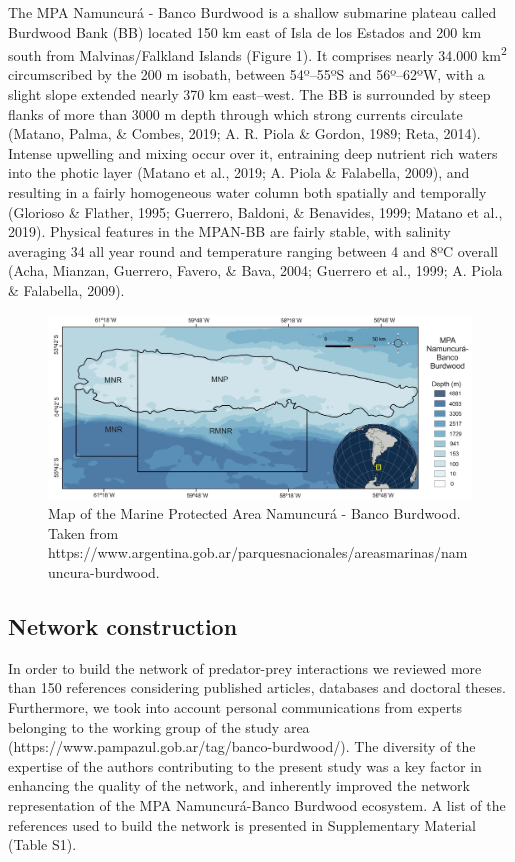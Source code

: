 \documentclass[preprint, 3p,
authoryear]{elsarticle} %
\begin{document}
The MPA Namuncurá - Banco Burdwood is a shallow submarine plateau called
Burdwood Bank (BB) located 150 km east of Isla de los Estados and 200 km
south from Malvinas/Falkland Islands (Figure 1). It comprises nearly
34.000 km\textsuperscript{2} circumscribed by the 200 m isobath, between
54º--55ºS and 56º--62ºW, with a slight slope extended nearly 370 km
east--west. The BB is surrounded by steep flanks of more than 3000 m
depth through which strong currents circulate (Matano, Palma, \& Combes,
2019; A. R. Piola \& Gordon, 1989; Reta, 2014). Intense upwelling and
mixing occur over it, entraining deep nutrient rich waters into the
photic layer (Matano et al., 2019; A. Piola \& Falabella, 2009), and
resulting in a fairly homogeneous water column both spatially and
temporally (Glorioso \& Flather, 1995; Guerrero, Baldoni, \& Benavides,
1999; Matano et al., 2019). Physical features in the MPAN-BB are fairly
stable, with salinity averaging 34 all year round and temperature
ranging between 4 and 8ºC overall (Acha, Mianzan, Guerrero, Favero, \&
Bava, 2004; Guerrero et al., 1999; A. Piola \& Falabella, 2009).

\begin{figure}
\includegraphics[width=1\linewidth]{MPABurdwood_map} \caption{Map of the Marine Protected Area Namuncurá - Banco Burdwood. Taken from https://www.argentina.gob.ar/parquesnacionales/areasmarinas/namuncura-burdwood.}\label{fig:figure1}
\end{figure}

\hypertarget{network-construction}{%
\subsection{Network construction}\label{network-construction}}

In order to build the network of predator-prey interactions we reviewed
more than 150 references considering published articles, databases and
doctoral theses. Furthermore, we took into account personal
communications from experts belonging to the working group of the study
area (https://www.pampazul.gob.ar/tag/banco-burdwood/). The diversity of
the expertise of the authors contributing to the present study was a key
factor in enhancing the quality of the network, and inherently improved
the network representation of the MPA Namuncurá-Banco Burdwood
ecosystem. A list of the references used to build the network is
presented in Supplementary Material (Table S1).
\end{document}
